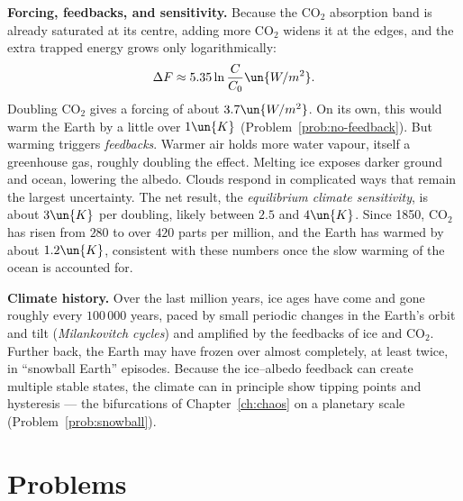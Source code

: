 \textbf{Forcing, feedbacks, and sensitivity.} Because the CO$_2$ absorption band is already saturated at its centre, adding more CO$_2$ widens it at the edges, and the extra trapped energy grows only logarithmically:
\[
  \Delta F\approx5.35\ln\frac{C}{C_0}\un{W/m^2}.
\]
Doubling CO$_2$ gives a forcing of about $3.7\un{W/m^2}$. On its own, this would warm the Earth by a little over $1\un{K}$ (Problem~\ref{prob:no-feedback}). But warming triggers \emph{feedbacks}. Warmer air holds more water vapour, itself a greenhouse gas, roughly doubling the effect. Melting ice exposes darker ground and ocean, lowering the albedo. Clouds respond in complicated ways that remain the largest uncertainty. The net result, the \emph{equilibrium climate sensitivity}, is about $3\un{K}$ per doubling, likely between $2.5$ and $4\un{K}$. Since 1850, CO$_2$ has risen from $280$ to over $420$ parts per million, and the Earth has warmed by about $1.2\un{K}$, consistent with these numbers once the slow warming of the ocean is accounted for.

\textbf{Climate history.} Over the last million years, ice ages have come and gone roughly every $100\,000$ years, paced by small periodic changes in the Earth's orbit and tilt (\emph{Milankovitch cycles}) and amplified by the feedbacks of ice and CO$_2$. Further back, the Earth may have frozen over almost completely, at least twice, in ``snowball Earth'' episodes. Because the ice--albedo feedback can create multiple stable states, the climate can in principle show tipping points and hysteresis --- the bifurcations of Chapter~\ref{ch:chaos} on a planetary scale (Problem~\ref{prob:snowball}).

\section{Problems}

